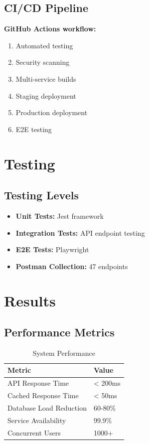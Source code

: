 \documentclass[12pt,a4paper]{article}
\begin{document}
\subsection{CI/CD Pipeline}
\textbf{GitHub Actions workflow:}
\begin{enumerate}
    \item Automated testing
    \item Security scanning
    \item Multi-service builds
    \item Staging deployment
    \item Production deployment
    \item E2E testing
\end{enumerate}

\section{Testing}

\subsection{Testing Levels}
\begin{itemize}
    \item \textbf{Unit Tests:} Jest framework
    \item \textbf{Integration Tests:} API endpoint testing
    \item \textbf{E2E Tests:} Playwright
    \item \textbf{Postman Collection:} 47 endpoints
\end{itemize}

\section{Results}

\subsection{Performance Metrics}
\begin{table}[h]
\centering
\begin{tabular}{@{}ll@{}}
\toprule
\textbf{Metric} & \textbf{Value} \\ \midrule
API Response Time & < 200ms \\
Cached Response Time & < 50ms \\
Database Load Reduction & 60-80\% \\
Service Availability & 99.9\% \\
Concurrent Users & 1000+ \\ \bottomrule
\end{tabular}
\caption{System Performance}
\end{table}
\end{document}
